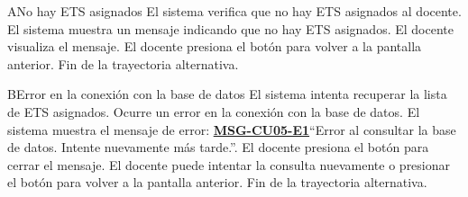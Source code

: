 \begin{UCtrayectoriaA}{A}{No hay ETS asignados}
	\UCpaso El sistema verifica que no hay ETS asignados al docente.
	\UCpaso El sistema muestra un mensaje indicando que no hay ETS asignados.
	\UCpaso[\UCactor] El docente visualiza el mensaje.
	\UCpaso[\UCactor] El docente presiona el botón  para volver a la pantalla anterior.
	\UCpaso Fin de la trayectoria alternativa.
\end{UCtrayectoriaA}

\begin{UCtrayectoriaA}{B}{Error en la conexión con la base de datos}
	\UCpaso El sistema intenta recuperar la lista de ETS asignados.
	\UCpaso Ocurre un error en la conexión con la base de datos.
	\UCpaso El sistema muestra el mensaje de error: \textbf{\hyperref[msg:CU05-E1]{MSG-CU05-E1}}{``Error al consultar la base de datos. Intente nuevamente más tarde.''}.
	\UCpaso[\UCactor] El docente presiona el botón  para cerrar el mensaje.
	\UCpaso[\UCactor] El docente puede intentar la consulta nuevamente o presionar el botón  para volver a la pantalla anterior.
	\UCpaso Fin de la trayectoria alternativa.
\end{UCtrayectoriaA}

